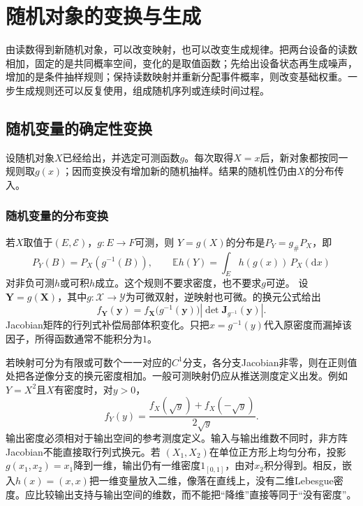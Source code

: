 \section{随机对象的变换与生成}
\label{sec:rv-transformations}
\label{sec:probability-random-vectors-transformations}
由读数得到新随机对象，可以改变映射，也可以改变生成规律。把两台设备的读数相加，固定的是共同概率空间，变化的是取值函数；先给出设备状态再生成噪声，增加的是条件抽样规则；保持读数映射并重新分配事件概率，则改变基础权重。一步生成规则还可以反复使用，组成随机序列或连续时间过程。

\subsection{随机变量的确定性变换}
设随机对象\(X\)已经给出，并选定可测函数\(g\)。每次取得\(X=x\)后，新对象都按同一规则取\(g(x)\)；因而变换没有增加新的随机抽样。结果的随机性仍由\(X\)的分布传入。

\subsubsection{随机变量的分布变换}
\label{sec:rv-pushforward}
若\(X\)取值于\((E,\mathcal E)\)，\(g:E\to F\)可测，则
\(Y=g(X)\)的分布是\(P_Y=g_\#P_X\)，即
\[
P_Y(B)=P_X(g^{-1}(B)),\qquad
\mathbb E h(Y)=\int_E h(g(x))\,P_X(\mathrm dx)
\]
对非负可测\(h\)或可积\(h\)成立。这个规则不要求密度，也不要求\(g\)可逆。
设\(\bm{Y}=g(\bm{X})\)，其中\(g:\mathcal{X}\to\mathcal{Y}\)为可微双射，逆映射也可微。的换元公式给出
\begin{equation}
  f_{\bm{Y}}(\bm{y})
  =
  f_{\bm{X}}\bigl(g^{-1}(\bm{y})\bigr)
  \left|
    \det\bm{J}_{g^{-1}}(\bm{y})
  \right|.
  \label{eq:probability-density-change-variables}
\end{equation}
Jacobian矩阵的行列式补偿局部体积变化。只把\(x=g^{-1}(y)\)代入原密度而漏掉该因子，所得函数通常不能积分为\(1\)。

若映射可分为有限或可数个一一对应的\(C^1\)分支，各分支Jacobian非零，则在正则值处把各逆像分支的换元密度相加。一般可测映射仍应从推送测度定义出发。例如\(Y=X^2\)且\(X\)有密度时，对\(y>0\)，
\[ f_Y(y)
  =\frac{f_X(\sqrt{y})+f_X(-\sqrt{y})}{2\sqrt{y}}. \]
输出密度必须相对于输出空间的参考测度定义。输入与输出维数不同时，非方阵Jacobian不能直接取行列式换元。若
\((X_1,X_2)\)在单位正方形上均匀分布，投影\(g(x_1,x_2)=x_1\)降到一维，输出仍有一维密度\(1_{[0,1]}\)，由对\(x_2\)积分得到。相反，嵌入\(h(x)=(x,x)\)把一维变量放入二维，像落在直线上，没有二维Lebesgue密度。应比较输出支持与输出空间的维数，而不能把“降维”直接等同于“没有密度”。

